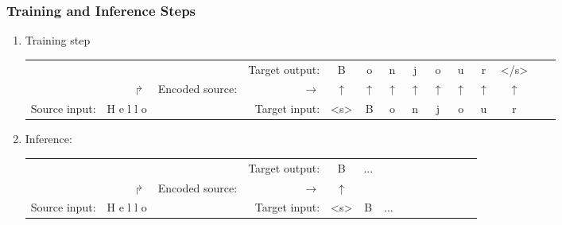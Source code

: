 \begin{frame}[fragile]
\frametitle{Training and Inference Steps}\color{structure}

\begin{enumerate}\color{structure}
\item Training step
\begin{center}
\begin{tiny}
\begin{tabular}{rrlrcccccccccc}
\hline
&&&Target output:& B &o& n &j &o &u& r &</s>\\
&$\Rsh$&Encoded source:&$\longrightarrow$&$\uparrow$&$\uparrow$&$\uparrow$&$\uparrow$&$\uparrow$&$\uparrow$&$\uparrow$&$\uparrow$\\
Source input: &H e l l o&& Target input:&<s> &B& o& n& j& o& u& r \\
\hline
\end{tabular}
\end{tiny}
\end{center}
\item Inference:
\begin{center}
\begin{tiny}
\begin{tabular}{rrrrcccccccccc}
\hline
&&&Target output:& B &...\\
&$\Rsh$&Encoded source:&$\longrightarrow$&$\uparrow$&\\
Source input: &H e l l o&& Target input:&<s> &B& ...\\
\hline
\end{tabular}
\end{tiny}
\end{center}
\end{enumerate}
\end{frame}


